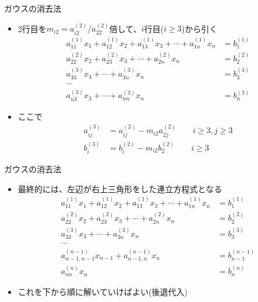 \documentclass[dvipdfmx]{beamer}
\begin{document}
\begin{frame}[t,fragile]{ガウスの消去法}
  \begin{itemize}
    \setlength{\itemsep}{1em}
  \item 2行目を$m_{i2} = a_{i2}^{(2)}/a_{22}^{(2)}$倍して、$i$行目($i \ge 3$)から引く
    \begin{align*}
    a_{11}^{(1)} x_1 + a_{12}^{(1)} x_2 + a_{13}^{(1)} x_3 + \cdots + a_{1n}^{(1)} x_n &= b_{1}^{(1)} \\
    a_{22}^{(2)} x_2 + a_{23}^{(2)} x_3 + \cdots + a_{2n}^{(2)} x_n &= b_{2}^{(2)} \\
    a_{33}^{(3)} x_3 + \cdots + a_{3n}^{(3)} x_n &= b_{3}^{(3)} \\
    \cdots \\
    a_{n3}^{(3)} x_3 + \cdots + a_{nn}^{(3)} x_n &= b_{n}^{(3)}
    \end{align*}
  \item ここで
    \begin{align*}
      a_{ij}^{(3)} &= a_{ij}^{(2)} - m_{i2} a_{2j}^{(2)} \qquad i \ge 3, j \ge 3 \\
      b_{i}^{(3)} &= b_{i}^{(2)} - m_{i2} b_{2}^{(2)} \qquad i \ge 3
    \end{align*}
  \end{itemize}
\end{frame}

\begin{frame}[t,fragile]{ガウスの消去法}
  \begin{itemize}
    \setlength{\itemsep}{1em}
  \item 最終的には、左辺が右上三角形をした連立方程式となる
    \begin{align*}
    a_{11}^{(1)} x_1 + a_{12}^{(1)} x_2 + a_{13}^{(1)} x_3 + \cdots + a_{1n}^{(1)} x_n &= b_{1}^{(1)} \\
    a_{22}^{(2)} x_2 + a_{23}^{(2)} x_3 + \cdots + a_{2n}^{(2)} x_n &= b_{2}^{(2)} \\
    a_{33}^{(3)} x_3 + \cdots + a_{3n}^{(3)} x_n &= b_{3}^{(3)} \\
    \cdots \\
    a_{n-1,n-1}^{(n-1)} x_{n-1} + a_{n-1,n}^{(n-1)} x_n &= b_{n-1}^{(n-1)} \\
    a_{nn}^{(n)} x_n &= b_{n}^{(n)}
    \end{align*}
  \item これを下から順に解いていけばよい(後退代入)
  \end{itemize}
\end{frame}
\end{document}
